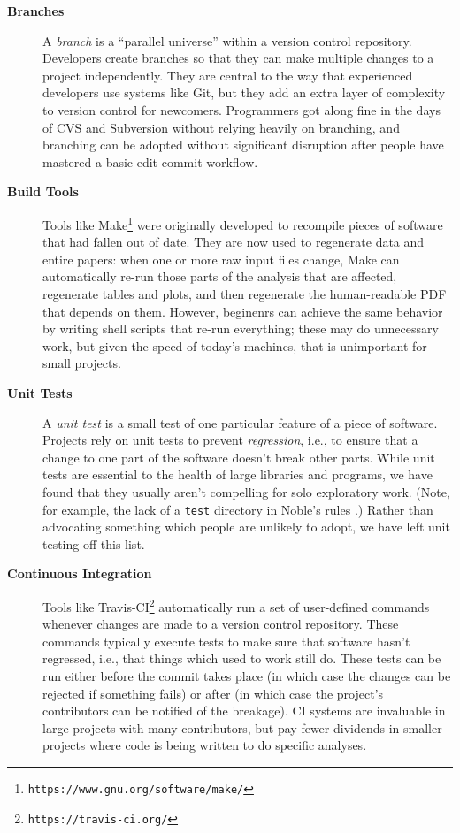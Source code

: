 \documentclass[10pt]{article}
\newcommand{\withurl}[2]{{#1}\footnote{\texttt{#2}}}
\begin{document}
\begin{description}

\item[\textbf{Branches}] A \emph{branch} is a ``parallel universe''
  within a version control repository. Developers create branches so
  that they can make multiple changes to a project independently. They
  are central to the way that experienced developers use systems like
  Git, but they add an extra layer of complexity to version control
  for newcomers.  Programmers got along fine in the days of CVS and
  Subversion without relying heavily on branching, and branching can
  be adopted without significant disruption after people have mastered
  a basic edit-commit workflow.

\item[\textbf{Build Tools}] Tools like
  \withurl{Make}{https://www.gnu.org/software/make/} were originally
  developed to recompile pieces of software that had fallen out of
  date. They are now used to regenerate data and entire papers: when
  one or more raw input files change, Make can automatically re-run
  those parts of the analysis that are affected, regenerate tables and
  plots, and then regenerate the human-readable PDF that depends on
  them.  However, beginenrs can achieve the same behavior by writing
  shell scripts that re-run everything; these may do unnecessary work,
  but given the speed of today's machines, that is unimportant for
  small projects.

\item[\textbf{Unit Tests}] A \emph{unit test} is a small test of one
  particular feature of a piece of software. Projects rely on unit
  tests to prevent \emph{regression}, i.e., to ensure that a change to
  one part of the software doesn't break other parts. While unit tests
  are essential to the health of large libraries and programs, we have
  found that they usually aren't compelling for solo exploratory
  work. (Note, for example, the lack of a \texttt{test} directory in
  Noble's rules \cite{noble2009}.)  Rather than advocating something
  which people are unlikely to adopt, we have left unit testing off
  this list.

\item[\textbf{Continuous Integration}] Tools like
  \withurl{Travis-CI}{https://travis-ci.org/} automatically run a set
  of user-defined commands whenever changes are made to a version
  control repository. These commands typically execute tests to make
  sure that software hasn't regressed, i.e., that things which used to
  work still do. These tests can be run either before the commit takes
  place (in which case the changes can be rejected if something fails)
  or after (in which case the project's contributors can be notified
  of the breakage). CI systems are invaluable in large projects with
  many contributors, but pay fewer dividends in smaller projects where
  code is being written to do specific analyses.


\end{description}
\end{document}

